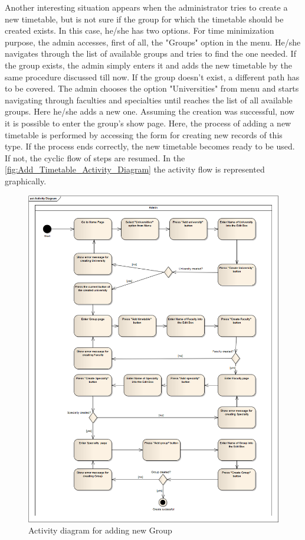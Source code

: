 Another interesting situation appears when the administrator tries to create a new timetable, but is not sure if the group for which the timetable should be created exists. In this case, he/she has two options. For time minimization purpose, the admin accesses, first of all, the "Groups" option in the menu. He/she navigates through the list of available groups and tries to find the one needed. If the group exists, the admin simply enters it and adds the new timetable by the same procedure discussed till now. If the group doesn't exist, a different path has to be covered. The admin chooses the option "Universities" from menu and starts navigating through faculties and specialties until reaches the list of all available groups. Here he/she adds a new one. Assuming the creation was successful, now it is possible to enter the group's show page. Here, the process of adding a new timetable is performed by accessing the form for creating new records of this type. If the process ends correctly, the new timetable becomes ready to be used. If not, the cyclic flow of steps are resumed. In the \autoref{fig:Add_Timetable_Activity_Diagram} the activity flow is represented graphically.

\begin{figure}[H]
\centering
\includegraphics[width=18cm]{Chapter2/Create_Activity_Diagram_inClass.png}
\caption{Activity diagram for adding new Group}
\label{fig:Create_Activity_Diagram_inClass}
\end{figure}

